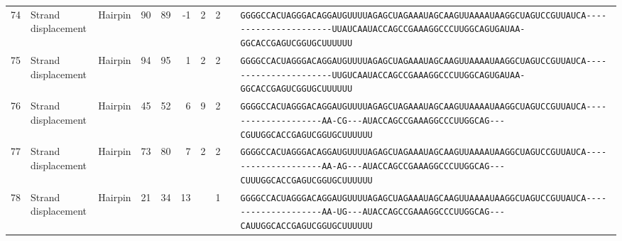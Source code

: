 \begin{tabular}{rllrrrrrcl}
 74 & Strand displacement & Hairpin & 90 & 89 & -1 & 2 & 2 &  &
 \color{ucsfdarkgrey}\verb|GGGGCCACUAGGGACAGGAU|\color{ucsforange}\verb|GUUUUA|\color{ucsfblue}\verb|GAGCUAGAAAUAGCAAGU|\color{ucsforange}\verb|UAAAAUAA|\color{ucsfnavy}\verb|GGCUAGUCCGU|\color{ucsforange}\verb|UAUCA|\color{ucsfteal}\verb|----------------------UUAUCA|\color{ucsfpurple}\verb|AUACCAGCCGAAAGGCCCUUGGCAG|\color{ucsfteal}\verb|UGAUAA-G|\color{ucsforange}\verb|GCACCGAGUCGGUGCUUUUUU| \\

 75 & Strand displacement & Hairpin & 94 & 95 & 1 & 2 & 2 &  &
 \color{ucsfdarkgrey}\verb|GGGGCCACUAGGGACAGGAU|\color{ucsforange}\verb|GUUUUA|\color{ucsfblue}\verb|GAGCUAGAAAUAGCAAGU|\color{ucsforange}\verb|UAAAAUAA|\color{ucsfnavy}\verb|GGCUAGUCCGU|\color{ucsforange}\verb|UAUCA|\color{ucsfteal}\verb|----------------------UUGUCA|\color{ucsfpurple}\verb|AUACCAGCCGAAAGGCCCUUGGCAG|\color{ucsfteal}\verb|UGAUAA-G|\color{ucsforange}\verb|GCACCGAGUCGGUGCUUUUUU| \\

 76 & Strand displacement & Hairpin & 45 & 52 & 6 & 9 & 2 &  &
 \color{ucsfdarkgrey}\verb|GGGGCCACUAGGGACAGGAU|\color{ucsforange}\verb|GUUUUA|\color{ucsfblue}\verb|GAGCUAGAAAUAGCAAGU|\color{ucsforange}\verb|UAAAAUAA|\color{ucsfnavy}\verb|GGCUAGUCCGU|\color{ucsforange}\verb|UAUCA|\color{ucsfteal}\verb|--------------------AA-CG---|\color{ucsfpurple}\verb|AUACCAGCCGAAAGGCCCUUGGCAG|\color{ucsfteal}\verb|---CGUUG|\color{ucsforange}\verb|GCACCGAGUCGGUGCUUUUUU| \\

 77 & Strand displacement & Hairpin & 73 & 80 & 7 & 2 & 2 &  &
 \color{ucsfdarkgrey}\verb|GGGGCCACUAGGGACAGGAU|\color{ucsforange}\verb|GUUUUA|\color{ucsfblue}\verb|GAGCUAGAAAUAGCAAGU|\color{ucsforange}\verb|UAAAAUAA|\color{ucsfnavy}\verb|GGCUAGUCCGU|\color{ucsforange}\verb|UAUCA|\color{ucsfteal}\verb|--------------------AA-AG---|\color{ucsfpurple}\verb|AUACCAGCCGAAAGGCCCUUGGCAG|\color{ucsfteal}\verb|---CUUUG|\color{ucsforange}\verb|GCACCGAGUCGGUGCUUUUUU| \\

 78 & Strand displacement & Hairpin & 21 & 34 & 13 &  & 1 &  &
 \color{ucsfdarkgrey}\verb|GGGGCCACUAGGGACAGGAU|\color{ucsforange}\verb|GUUUUA|\color{ucsfblue}\verb|GAGCUAGAAAUAGCAAGU|\color{ucsforange}\verb|UAAAAUAA|\color{ucsfnavy}\verb|GGCUAGUCCGU|\color{ucsforange}\verb|UAUCA|\color{ucsfteal}\verb|--------------------AA-UG---|\color{ucsfpurple}\verb|AUACCAGCCGAAAGGCCCUUGGCAG|\color{ucsfteal}\verb|---CAUUG|\color{ucsforange}\verb|GCACCGAGUCGGUGCUUUUUU| \\


\end{tabular}
